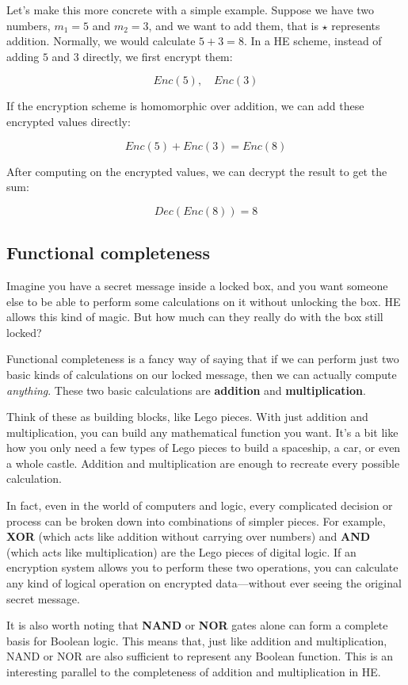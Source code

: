 \documentclass[
  letterpaper,
  DIV=11,
  numbers=noendperiod,
  oneside]{scrartcl}
\begin{document}
Let's make this more concrete with a simple example. Suppose we have two
numbers, \(m_1 = 5\) and \(m_2 = 3\), and we want to add them, that is
\(\star\) represents addition. Normally, we would calculate
\(5 + 3 = 8\). In a HE scheme, instead of adding \(5\) and \(3\)
directly, we first encrypt them:

\[
Enc(5), \quad Enc(3)
\]

If the encryption scheme is homomorphic over addition, we can add these
encrypted values directly:

\[
Enc(5) + Enc(3) = Enc(8)
\]

After computing on the encrypted values, we can decrypt the result to
get the sum:

\[
Dec(Enc(8)) = 8
\]

\subsection{Functional completeness}\label{functional-completeness}

Imagine you have a secret message inside a locked box, and you want
someone else to be able to perform some calculations on it without
unlocking the box. HE allows this kind of magic. But how much can they
really do with the box still locked?

Functional completeness is a fancy way of saying that if we can perform
just two basic kinds of calculations on our locked message, then we can
actually compute \emph{anything}. These two basic calculations are
\textbf{addition} and \textbf{multiplication}.

Think of these as building blocks, like Lego pieces. With just addition
and multiplication, you can build any mathematical function you want.
It's a bit like how you only need a few types of Lego pieces to build a
spaceship, a car, or even a whole castle. Addition and multiplication
are enough to recreate every possible calculation.

In fact, even in the world of computers and logic, every complicated
decision or process can be broken down into combinations of simpler
pieces. For example, \textbf{XOR} (which acts like addition without
carrying over numbers) and \textbf{AND} (which acts like multiplication)
are the Lego pieces of digital logic. If an encryption system allows you
to perform these two operations, you can calculate any kind of logical
operation on encrypted data---without ever seeing the original secret
message.

It is also worth noting that \textbf{NAND} or \textbf{NOR} gates alone
can form a complete basis for Boolean logic. This means that, just like
addition and multiplication, NAND or NOR are also sufficient to
represent any Boolean function. This is an interesting parallel to the
completeness of addition and multiplication in HE.
\end{document}
